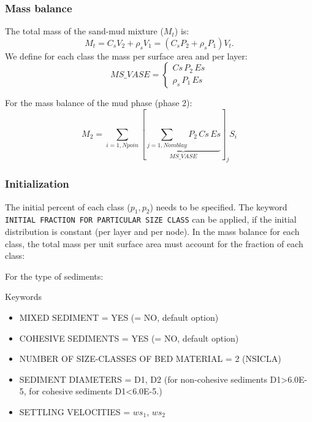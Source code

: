 \subsubsection{Mass balance}
The total mass of the sand-mud mixture ($M_t$) is:
\begin{equation*}
M_t =C_s V_2 + \rho_s V_1 = \left(C_sP_2+\rho_sP_1\right)V_t. 
\end{equation*}
We define for each class the mass per surface area and per layer:
\begin{equation*}
MS\_VASE=\left\{\begin{array}{l}
Cs\,P_2\,Es \\
\rho_s\,P_1\, Es
\end{array}
\right. 
\end{equation*}

For the mass balance of the mud phase (phase 2):
\begin{equation*}
M_2 =\sum\limits_{i=1,Npoin}
\left[\underbrace{\sum\limits_{j=1,Nomblay}P_2\,Cs\,Es}_{MS\_VASE}\right]_j S_i 
\end{equation*}%

\subsubsection{Initialization}
The initial percent of each class ($p_1, p_2$) needs to be specified.
The keyword \texttt{INITIAL FRACTION FOR PARTICULAR SIZE CLASS} can be applied, if
the initial distribution is constant (per layer and per node). In the mass balance for each class, the total mass per unit surface area must account for the fraction of each class:

For the type of sediments:
\medskip
\begin{bclogo}[couleur=blue!10,arrondi=0.1, logo=\bcinfo]{Keywords}
\begin{itemize}
\item {\ttfamily MIXED SEDIMENT = YES} ({\ttfamily = NO}, default option)
\item {\ttfamily COHESIVE SEDIMENTS = YES} ({\ttfamily = NO}, default option)
\item {\ttfamily NUMBER OF SIZE-CLASSES OF BED MATERIAL = 2} ({\ttfamily NSICLA}) 
\item {\ttfamily SEDIMENT DIAMETERS = D1, D2} (for non-cohesive sediments {\ttfamily D1>6.0E-5}, for cohesive sediments {\ttfamily D1<6.0E-5}.)
\item {\ttfamily SETTLING VELOCITIES = $ws_1$, $ws_2$} 
\end{itemize}
\end{bclogo}

